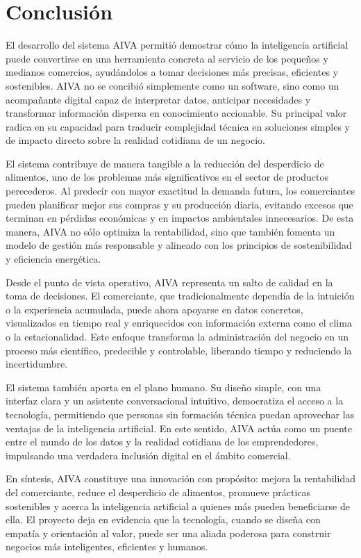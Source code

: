 \chapter{Conclusi\'on}\label{conclussions}


El desarrollo del sistema AIVA permitió demostrar cómo la inteligencia artificial puede convertirse en una herramienta concreta al servicio de los pequeños y medianos comercios, ayudándolos a tomar decisiones más precisas, eficientes y sostenibles.  
AIVA no se concibió simplemente como un software, sino como un acompañante digital capaz de interpretar datos, anticipar necesidades y transformar información dispersa en conocimiento accionable. Su principal valor radica en su capacidad para traducir complejidad técnica en soluciones simples y de impacto directo sobre la realidad cotidiana de un negocio.

El sistema contribuye de manera tangible a la reducción del desperdicio de alimentos, uno de los problemas más significativos en el sector de productos perecederos. Al predecir con mayor exactitud la demanda futura, los comerciantes pueden planificar mejor sus compras y su producción diaria, evitando excesos que terminan en pérdidas económicas y en impactos ambientales innecesarios.  
De esta manera, AIVA no sólo optimiza la rentabilidad, sino que también fomenta un modelo de gestión más responsable y alineado con los principios de sostenibilidad y eficiencia energética.

Desde el punto de vista operativo, AIVA representa un salto de calidad en la toma de decisiones. El comerciante, que tradicionalmente dependía de la intuición o la experiencia acumulada, puede ahora apoyarse en datos concretos, visualizados en tiempo real y enriquecidos con información externa como el clima o la estacionalidad. Este enfoque transforma la administración del negocio en un proceso más científico, predecible y controlable, liberando tiempo y reduciendo la incertidumbre.

El sistema también aporta en el plano humano. Su diseño simple, con una interfaz clara y un asistente conversacional intuitivo, democratiza el acceso a la tecnología, permitiendo que personas sin formación técnica puedan aprovechar las ventajas de la inteligencia artificial. En este sentido, AIVA actúa como un puente entre el mundo de los datos y la realidad cotidiana de los emprendedores, impulsando una verdadera inclusión digital en el ámbito comercial.

En síntesis, AIVA constituye una innovación con propósito: mejora la rentabilidad del comerciante, reduce el desperdicio de alimentos, promueve prácticas sostenibles y acerca la inteligencia artificial a quienes más pueden beneficiarse de ella.  
El proyecto deja en evidencia que la tecnología, cuando se diseña con empatía y orientación al valor, puede ser una aliada poderosa para construir negocios más inteligentes, eficientes y humanos.


